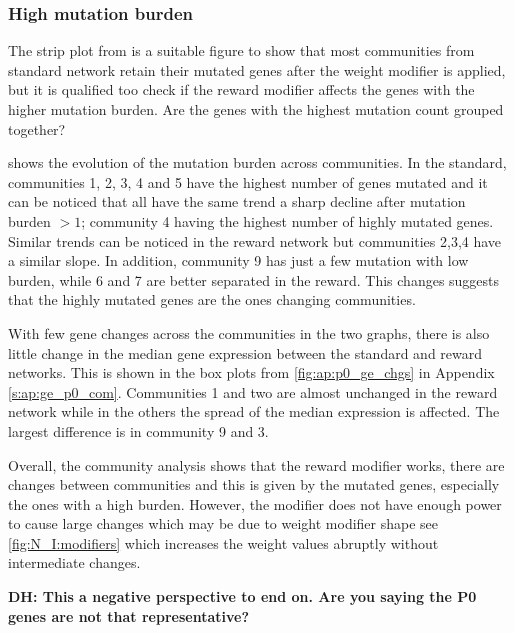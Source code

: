 \subsubsection*{High mutation burden}

The strip plot from  is a suitable figure to show that most communities from standard network retain their mutated genes after the weight modifier is applied, but it is qualified too check if the reward modifier affects the genes with the higher mutation burden. Are the genes with the highest mutation count grouped together?

 shows the evolution of the mutation burden across communities. In the standard, communities 1, 2, 3, 4 and 5 have the highest number of genes mutated and it can be noticed that all have the same trend a sharp decline after mutation burden $>1$; community 4 having the highest number of highly mutated genes. Similar trends can be noticed in the reward network but communities 2,3,4 have a similar slope. In addition, community 9 has just a few mutation with low burden, while 6 and 7 are better separated in the reward. This changes suggests that the highly mutated genes are the ones changing communities.

With few gene changes across the communities in the two graphs, there is also little change in the median gene expression between the standard and reward networks. This is shown in the box plots from \cref{fig:ap:p0_ge_chgs} in Appendix \cref{s:ap:ge_p0_com}. Communities 1 and two are almost unchanged in the reward network while in the others the spread of the median expression is affected. The largest difference is in community 9 and 3.  

Overall, the community analysis shows that the reward modifier works, there are changes between communities and this is given by the mutated genes, especially the ones with a high burden. However, the modifier does not have enough power to cause large changes which may be due to weight modifier shape see \cref{fig:N_I:modifiers} which increases the weight values abruptly without intermediate changes.

\textbf{DH: This a negative perspective to end on. Are you saying the P0 genes are not that representative? }

